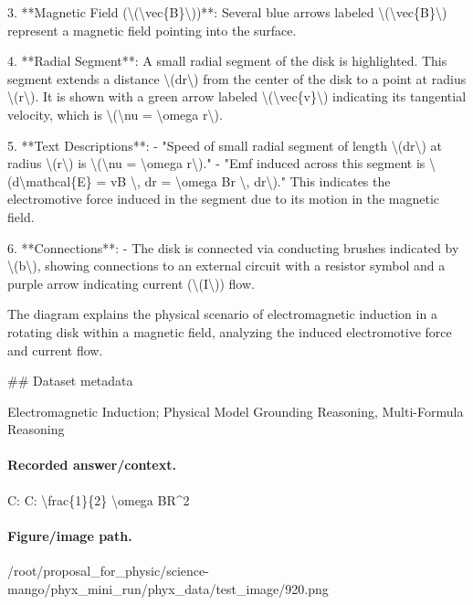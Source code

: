 3. **Magnetic Field (\textbackslash{}(\textbackslash{}vec\{B\}\textbackslash{}))**: Several blue arrows labeled \textbackslash{}(\textbackslash{}vec\{B\}\textbackslash{}) represent a magnetic field pointing into the surface.

4. **Radial Segment**: A small radial segment of the disk is highlighted. This segment extends a distance \textbackslash{}(dr\textbackslash{}) from the center of the disk to a point at radius \textbackslash{}(r\textbackslash{}). It is shown with a green arrow labeled \textbackslash{}(\textbackslash{}vec\{v\}\textbackslash{}) indicating its tangential velocity, which is \textbackslash{}(\textbackslash{}nu = \textbackslash{}omega r\textbackslash{}).

5. **Text Descriptions**:
   - "Speed of small radial segment of length \textbackslash{}(dr\textbackslash{}) at radius \textbackslash{}(r\textbackslash{}) is \textbackslash{}(\textbackslash{}nu = \textbackslash{}omega r\textbackslash{})."
   - "Emf induced across this segment is \textbackslash{}(d\textbackslash{}mathcal\{E\} = vB \textbackslash{}, dr = \textbackslash{}omega Br \textbackslash{}, dr\textbackslash{})." This indicates the electromotive force induced in the segment due to its motion in the magnetic field.

6. **Connections**:
   - The disk is connected via conducting brushes indicated by \textbackslash{}(b\textbackslash{}), showing connections to an external circuit with a resistor symbol and a purple arrow indicating current (\textbackslash{}(I\textbackslash{})) flow. 

The diagram explains the physical scenario of electromagnetic induction in a rotating disk within a magnetic field, analyzing the induced electromotive force and current flow.

\#\# Dataset metadata

Electromagnetic Induction; Physical Model Grounding Reasoning, Multi-Formula Reasoning

\paragraph{Recorded answer/context.}
C: C: \textbackslash{}frac\{1\}\{2\} \textbackslash{}omega BR\textasciicircum{}2

\paragraph{Figure/image path.}
/root/proposal\_for\_physic/science-mango/phyx\_mini\_run/phyx\_data/test\_image/920.png

